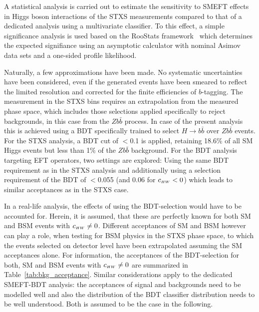 A statistical analysis is carried out to estimate the sensitivity to SMEFT effects in Higgs boson interactions of the STXS measurements compared to that of a dedicated analysis using a multivariate classifier. To this effect, a simple significance analysis is used based on the {\sc RooStats} framework~\cite{Moneta:2010pm} which determines the expected signifiance using an asymptotic calculator with nominal Asimov data sets and a one-sided profile likelihood. 

Naturally, a few approximations have been made. No systematic uncertainties have been considered, even if the generated events have been smeared to reflect the limited resolution and corrected for the finite efficiencies of $b$-tagging. The measurement in the STXS bins requires an extrapolation from the measured phase space, which includes those selections applied specifically to reject backgrounds, in this case from the $Z b\bar{b}$ process. In case of the present analysis this is achieved using a BDT specifically trained to select $H\to b\bar{b}$ over $Z b\bar{b}$ events. For the STXS analysis, a BDT cut of $<$0.1 is applied, retaining 18.6\% of all SM Higgs events but less than 1\% of the $Z b\bar{b}$ background. For the BDT analysis targeting EFT operators, two settings are explored: Using the same BDT requirement as in the STXS analysis and additionally using a selection requirement of the BDT of $<$0.055 (and 0.06 for $c_{\scriptscriptstyle HW} <0$) which leads to similar acceptances as in the STXS case. 

In a real-life analysis, the effects of using the BDT-selection would have to be accounted for. Herein, it is assumed, that these are perfectly known for both SM and BSM events with $c_{\scriptscriptstyle HW} \neq 0$. Different acceptances of SM and BSM however can play a role, when testing for BSM physics in the STXS phase space, to which the events selected on detector level have been extrapolated assuming the SM acceptances alone. For information, the acceptances of the BDT-selection for both, SM and BSM events with $c_{\scriptscriptstyle HW} \neq 0$ are summarized in Table~\ref{tab:bkg_acceptance}. Similar considerations apply to the dedicated SMEFT-BDT analysis: the acceptances of signal and backgrounds need to be modelled well and also the distribution of the BDT classifier distribution needs to be well understood. Both is assumed to be the case in the following.

